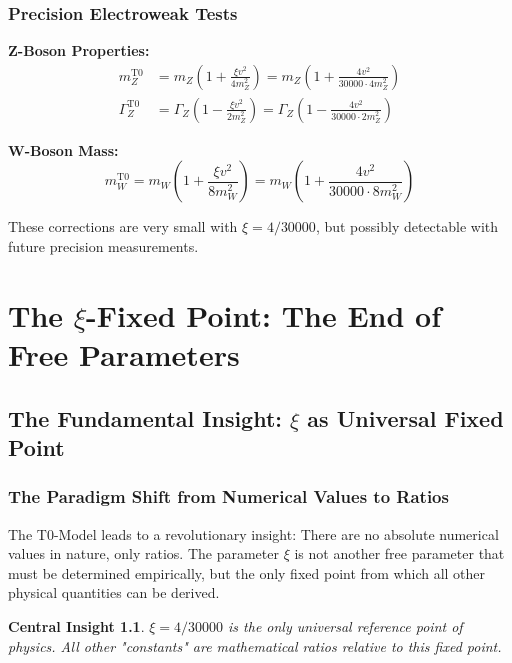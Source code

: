 \documentclass[12pt,a4paper]{report}
\newcommand{\xipar}{\xi}      %
\newtheorem{insight}{Central Insight}[chapter]
\begin{document}
	\subsection{Precision Electroweak Tests}\label{subsec:precision_electroweak}
	
	\textbf{Z-Boson Properties:}
	\begin{align}
		m_Z^{\text{T0}} &= m_Z \left(1 + \frac{\xipar v^2}{4m_Z^2}\right) = m_Z \left(1 + \frac{4 v^2}{30000 \cdot 4m_Z^2}\right) \\
		\Gamma_Z^{\text{T0}} &= \Gamma_Z \left(1 - \frac{\xipar v^2}{2m_Z^2}\right) = \Gamma_Z \left(1 - \frac{4 v^2}{30000 \cdot 2m_Z^2}\right)
	\end{align}
	
	\textbf{W-Boson Mass:}
	\begin{equation}
		m_W^{\text{T0}} = m_W \left(1 + \frac{\xipar v^2}{8m_W^2}\right) = m_W \left(1 + \frac{4 v^2}{30000 \cdot 8m_W^2}\right)
	\end{equation}
	
	These corrections are very small with $\xipar = 4/30000$, but possibly detectable with future precision measurements.
	\chapter{The $\xi$-Fixed Point: The End of Free Parameters}
	
	\section{The Fundamental Insight: $\xi$ as Universal Fixed Point}
	
	\subsection{The Paradigm Shift from Numerical Values to Ratios}
	
	The T0-Model leads to a revolutionary insight: There are no absolute numerical values in nature, only ratios. The parameter $\xi$ is not another free parameter that must be determined empirically, but the only fixed point from which all other physical quantities can be derived.
	
	\begin{insight}
		$\xi = 4/30000$ is the only universal reference point of physics. All other "constants" are mathematical ratios relative to this fixed point.
	\end{insight}
	
\end{document}

